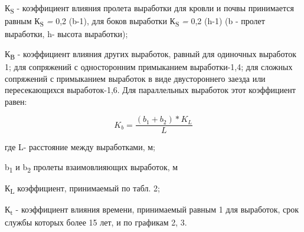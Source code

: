 \begin{multicols}{2}
К\textsubscript{S} - ко­эффициент влияния пролета выработки для кровли и
почвы принимается равным К\textsubscript{S} \emph{=} 0,2 (b-1), для
боков выработки К\textsubscript{S} \emph{=} 0,2 (h-1) (b - пролет
выработки, h- высота выработки);

К\textsubscript{В} - коэффициент влияния других вы­работок, равный для
одиночных выработок 1; для сопряжений с односторонним примыканием
выработки-1,4; для сложных сопряжений с примыканием выработок в виде
двустороннего заезда или пересекающихся выработок-1,6. Для параллель­ных
выработок этот коэффициент равен:

\begin{equation}
K_{b} = \frac{(b_1+b_2)*K_L}{L}
\end{equation}

где L- расстояние между выработками, м;

b\textsubscript{1} и b\textsubscript{2} пролеты взаимовлияющих
выработок, м

К\textsubscript{L} коэффициент, принимаемый по табл. 2;

К\textsubscript{t} - коэффициент влияния времени, принимаемый равным 1
для выработок, срок службы которых более 15 лет, и по графикам 2, 3.
\end{multicols}

